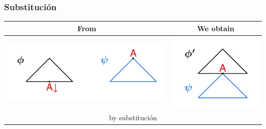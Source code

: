 \documentclass[compress,color=usenames]{beamer}
\begin{document}
\begin{frame}
\frametitle{Substituci\'on}

\begin{center}
\begin{tabular}{|c|c|} \hline
From & We obtain \\ \hline

\includegraphics[scale=.4]{pics/pic2-17.jpg} & 

\includegraphics[scale=.4]{pics/pic2-18.jpg} \\ \hline

\multicolumn{2}{|c|}{by substituci\'on}  \\ \hline
\end{tabular}
\end{center}\pause



\end{frame}
\end{document}
